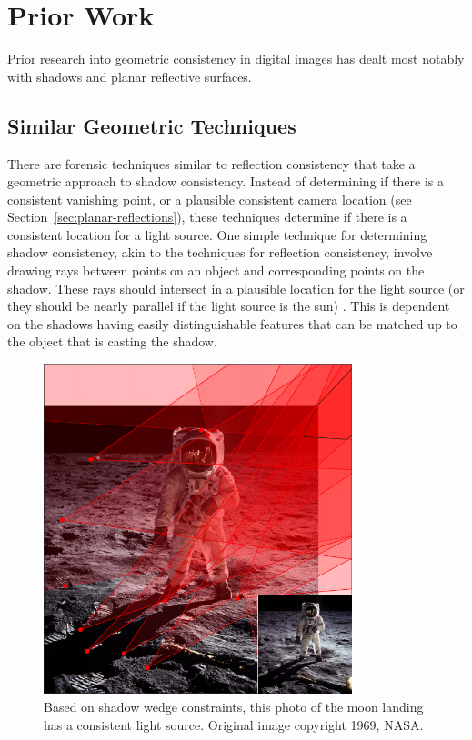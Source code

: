 \documentclass{thesis}
\begin{document}
\pagestyle{plain}





\chapter{Prior Work}
Prior research into geometric consistency in digital images has dealt most notably with shadows and planar reflective surfaces.
\section{Similar Geometric Techniques}
There are forensic techniques similar to reflection consistency that take a geometric approach to shadow consistency. Instead of determining if there is a consistent vanishing point, or a plausible consistent camera location (see Section~\ref{sec:planar-reflections}), these techniques determine if there is a consistent location for a light source. One simple technique for determining shadow consistency, akin to the techniques for reflection consistency, involve drawing rays between points on an object and corresponding points on the shadow. These rays should intersect in a plausible location for the light source (or they should be nearly parallel if the light source is the sun) \cite{farid2010image}. This is dependent on the shadows having easily distinguishable features that can be matched up to the object that is casting the shadow.

\begin{figure}[h]
	\centering
    	\includegraphics[width=0.8\textwidth]{moon-landing-consistent}
	\caption{Based on shadow wedge constraints, this photo of the moon landing has a consistent light source. Original image copyright 1969, NASA. \cite[Fig.~1]{kee2013exposing}}
	\label{moon-landing-consistent}
\end{figure}
\end{document}
